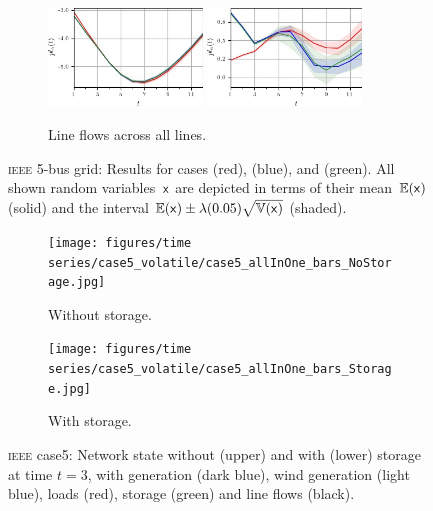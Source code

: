 \documentclass[final,3p,times,twocolumn]{elsarticle}  %
\begin{document}
\begin{figure}
\begin{subfigure}[c]{\figwidth}
        \includegraphics[width=0.45\textwidth]{figures/time series/case5_volatile/line_905.jpg}
        \includegraphics[width=0.45\textwidth]{figures/time series/case5_volatile/line_906.jpg}
		\vspace{-2mm}		
		\caption{Line flows across all lines.}
		\label{fig:case5:LineFlows_volatile}
	\end{subfigure}
	\vspace{\adjustlength}
	\caption{\textsc{ieee} 5-bus grid: Results for cases \caseNoStorage (red), \caseStorage (blue), and \caseStorageWithVariance (green). All shown random variables~$\mathsf{x}$ are depicted in terms of their mean~$\mathbb{E}(\mathsf{x})$ (solid) and the interval $\mathbb{E}(\mathsf{x}) \pm \lambda (0.05) \sqrt{\mathbb{V}(\mathsf{x})}$ (shaded).}
	\label{fig:case5:results_volatile_newLoads}
\end{figure}

\begin{figure}
	\begin{subfigure}[c]{\figwidth}
    \centering
    \texttt{[image: figures/time series/case5\_volatile/case5\_allInOne\_bars\_NoStorage.jpg]}
    \caption{Without storage.}
    \label{fig:case5_results_grids_NoStorage}
\end{subfigure}
\begin{subfigure}[c]{\figwidth}
    \centering
    \texttt{[image: figures/time series/case5\_volatile/case5\_allInOne\_bars\_Storage.jpg]}
    \caption{With storage.}
    \label{fig:case5_results_grids_Storage}
    \end{subfigure}
    \caption{\textsc{ieee} case5: Network state without (upper) and with (lower) storage at time $t=3$, with generation (dark blue), wind generation (light blue), loads (red), storage (green) and line flows (black).}
    \label{fig:case5:results_grids}
\end{figure}
\end{document}
